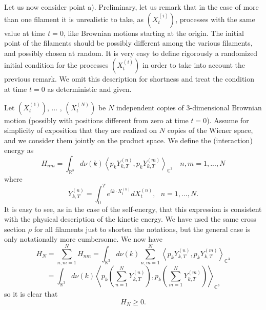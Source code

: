 Let us now consider point a). 
Preliminary, let us remark that in the case of more than one filament
it is unrealistic to take, as $(X_{t}^{\left( i\right) })$, processes with
the same value at time $t=0$, like Brownian motions starting at the origin. 
The initial point of the filaments should be
possibly different among the various filaments, and possibly chosen at
random. It is very easy to define rigorously a randomized initial condition
for the processes $(X_{t}^{\left( i\right) })$ in order to take into account
the previous remark. We omit this description for shortness and treat the
condition at time $t=0$ as deterministic and given. 

Let $(X_{t}^{\left( 1\right) })$, ... , $(X_{t}^{\left( N\right) })$ be $N$
independent copies of 3-dimensional Brownian motion (possibly with positions
different from zero at time $t=0$). Assume for simplicity of exposition that
they are realized on $N$ copies of the Wiener space, and we consider them
jointly on the product space. We define the (interaction) energy as
\begin{equation*}
H_{nm}=\int_{\mathbb{R}^{3}}d\nu \left( k\right)  \left\langle
p_{k}Y_{k,T}^{\left( n\right) },p_{k}Y_{k,T}^{\left( m\right)
  }\right\rangle_{\mathbb{C}^{3}}
\,\,\,\,\,\,n,m=1,...,N
\end{equation*}
where 
\begin{equation*}
Y_{k,T}^{\left( n\right) }=\int_{0}^{T}e^{ik\cdot X_{t}^{\left( n\right)
}}dX_{t}^{\left( n\right) },\,\,\,\,n=1,...,N.
\end{equation*}
It is easy to see, as in the case of the self-energy, that this expression
is consistent with the physical description of the kinetic energy. We have
used the same cross section $\rho $ for all filaments just to shorten the
notations, but the general case is only notationally more cumbersome. We now
have
\begin{equation*}
H_{N}=\sum_{n,m=1}^{N}H_{nm}=\int_{\mathbb{R}^{3}}d\nu \left( k\right)
\sum_{n,m=1}^{N}\left\langle p_{k}Y_{k,T}^{\left( n\right)
},p_{k}Y_{k,T}^{\left( m\right) }\right\rangle _{\mathbb{C}%
^{3}}
\end{equation*}
\begin{equation*}
=\int_{\mathbb{R}^{3}}d\nu \left( k\right) \left\langle 
p_{k}\left( \sum_{n=1}^{N}Y_{k,T}^{\left( n\right) }\right) ,p_{k}\left(
\sum_{m=1}^{N}Y_{k,T}^{\left( m\right) }\right) \right\rangle
_{\mathbb{C}^{3}}
\end{equation*}
so it is clear that 
\begin{equation*}
H_{N}\geq 0.
\end{equation*}
